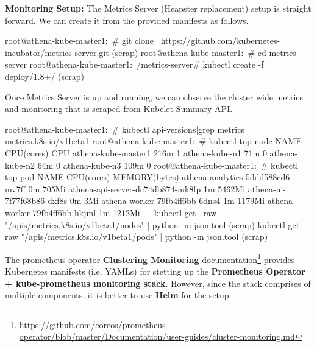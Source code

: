 \noindent \textbf{Monitoring Setup:} \quad The Metrics Server (Heapster replacement) setup is straight forward. We can create it from the provided manifests as follows.

\begin{small}
\begin{lcverbatim}
root@athena-kube-master1:~# git clone \
		https://github.com/kubernetes-incubator/metrics-server.git
(scrap)
root@athena-kube-master1:~# cd metrics-server
root@athena-kube-master1:~/metrics-server# kubectl create -f deploy/1.8+/
(scrap)
\end{lcverbatim}
\end{small}

Once Metrics Server is up and running, we can observe the cluster wide metrics and monitoring that is scraped from Kubelet Summary API.

\begin{small}
\begin{lcverbatim}
root@athena-kube-master1:~# kubectl api-versions|grep metrics
metrics.k8s.io/v1beta1
root@athena-kube-master1:~# kubectl top node
NAME                  CPU(cores)   CPU%
athena-kube-master1   216m         1%
athena-kube-n1        71m          0%
athena-kube-n2        64m          0%
athena-kube-n3        109m         0%
root@athena-kube-master1:~# kubectl top pod
NAME                                CPU(cores)   MEMORY(bytes)
athena-analytics-5ddd588cd6-mv7ff   0m           705Mi
athena-api-server-dc74db874-mk8fp   1m           5462Mi
athena-ui-7f77f68b86-dxf8s          0m           3Mi
athena-worker-79fb4ff6bb-6dns4      1m           1179Mi
athena-worker-79fb4ff6bb-hkjml      1m           1212Mi
---
kubectl get --raw "/apis/metrics.k8s.io/v1beta1/nodes" | python -m json.tool
(scrap)
kubectl get --raw "/apis/metrics.k8s.io/v1beta1/pods" | python -m json.tool
(scrap)
\end{lcverbatim}
\end{small}

The prometheus operator \textbf{Clustering Monitoring} documentation\footnote{\url{https://github.com/coreos/prometheus-operator/blob/master/Documentation/user-guides/cluster-monitoring.md}} provides Kubernetes manifests (i.e. YAMLs) for stetting up the \textbf{Prometheus Operator + kube-prometheus monitoring stack}. However, since the stack comprises of multiple components, it is better to use \textbf{Helm} for the setup.  

